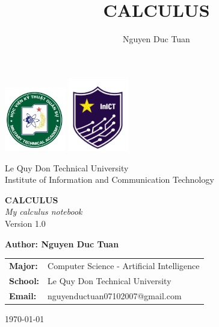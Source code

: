 \documentclass[12pt, a4paper, oneside]{book}
\title{CALCULUS}
\author{Nguyen Duc Tuan}
\begin{document}
\frontmatter 

\begin{titlepage}
    \centering %
    
    
    \includegraphics[width=0.2\textwidth]{images/logo-hoc-vien-ky-thuat-quan-su.jpg}
    \includegraphics[width=0.2\textwidth]{images/InICT.png}
    \vspace{0.5cm} %

    {\large Le Quy Don Technical University} \\
    \vspace{0.25cm}
    {\large Institute of Information and Communication Technology}
    \vspace{0.2cm} 
   
    
    \vfill %
    
    {\Huge \bfseries CALCULUS} \\
    \vspace{0.5cm}
    {\Large \itshape My calculus notebook} \\
    \vspace{1cm}
    {\large Version 1.0} \\ %
    
    \vfill %
    
    {\Large \bfseries Author: Nguyen Duc Tuan}
    \vspace{0.5cm}
    
    \begin{tabular}{l l}
        \bfseries Major: & Computer Science - Artificial Intelligence \\
        \bfseries School: & Le Quy Don Technical University \\
        \bfseries Email: & nguyenductuan07102007@gmail.com \\
    \end{tabular}
    
    \vspace{1cm}
    
    {\large \today}

\end{titlepage}

\tableofcontents 

\mainmatter 

\end{document}
